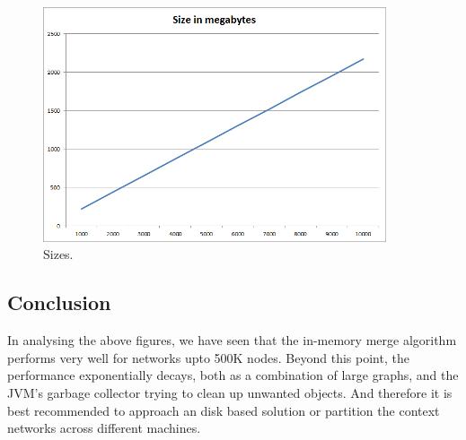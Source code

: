 \begin{figure}[t]
\centering
\includegraphics[width=0.9\textwidth]{media/chapter5/perf/size-10K.png}
\caption{Sizes.}
\label{fig:sizes}
\end{figure}


\subsection{Conclusion}

In analysing the above figures, we have seen that the in-memory merge algorithm performs very well for networks upto 500K nodes. Beyond this point, the performance exponentially decays, both as a combination of large graphs, and the JVM's garbage collector trying to clean up unwanted objects. And therefore it is best recommended to approach an disk based solution or partition the context networks across different machines.